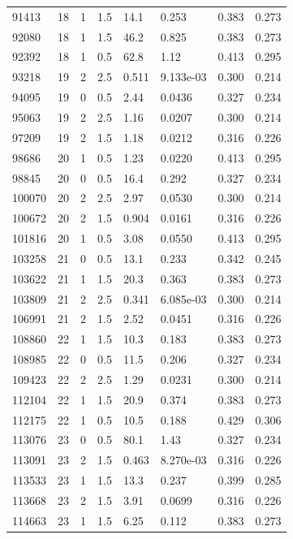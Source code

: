 \documentclass[preview]{standalone}
\begin{document}
{{{\begin{tabular}{L{1.2cm}C{1.2cm} C{0.3cm}C{0.5cm} C{1.4cm}C{1.4cm} C{1.4cm}C{1.4cm}}
  91413  &    18  & 1     & 1.5 &  14.1  & 0.253  & 0.383 &  0.273   \\ 
  92080  &    18  & 1     & 1.5 &  46.2  & 0.825  & 0.383 &  0.273   \\ 
  92392  &    18  & 1     & 0.5 &  62.8  & 1.12  & 0.413 &  0.295   \\ 
  93218  &    19  & 2     & 2.5 &  0.511  & 9.133e-03  & 0.300 &  0.214   \\ 
  94095  &    19  & 0     & 0.5 &  2.44  & 0.0436  & 0.327 &  0.234   \\ 
  95063  &    19  & 2     & 2.5 &  1.16  & 0.0207  & 0.300 &  0.214   \\ 
  97209  &    19  & 2     & 1.5 &  1.18  & 0.0212  & 0.316 &  0.226   \\ 
  98686  &    20  & 1     & 0.5 &  1.23  & 0.0220  & 0.413 &  0.295   \\ 
  98845  &    20  & 0     & 0.5 &  16.4  & 0.292  & 0.327 &  0.234   \\ 
  100070  &    20  & 2     & 2.5 &  2.97  & 0.0530  & 0.300 &  0.214   \\ 
  100672  &    20  & 2     & 1.5 &  0.904  & 0.0161  & 0.316 &  0.226   \\ 
  101816  &    20  & 1     & 0.5 &  3.08  & 0.0550  & 0.413 &  0.295   \\ 
  103258  &    21  & 0     & 0.5 &  13.1  & 0.233  & 0.342 &  0.245   \\ 
  103622  &    21  & 1     & 1.5 &  20.3  & 0.363  & 0.383 &  0.273   \\ 
  103809  &    21  & 2     & 2.5 &  0.341  & 6.085e-03  & 0.300 &  0.214   \\ 
  106991  &    21  & 2     & 1.5 &  2.52  & 0.0451  & 0.316 &  0.226   \\ 
  108860  &    22  & 1     & 1.5 &  10.3  & 0.183  & 0.383 &  0.273   \\ 
  108985  &    22  & 0     & 0.5 &  11.5  & 0.206  & 0.327 &  0.234   \\ 
  109423  &    22  & 2     & 2.5 &  1.29  & 0.0231  & 0.300 &  0.214   \\ 
  112104  &    22  & 1     & 1.5 &  20.9  & 0.374  & 0.383 &  0.273   \\ 
  112175  &    22  & 1     & 0.5 &  10.5  & 0.188  & 0.429 &  0.306   \\ 
  113076  &    23  & 0     & 0.5 &  80.1  & 1.43  & 0.327 &  0.234   \\ 
  113091  &    23  & 2     & 1.5 &  0.463  & 8.270e-03  & 0.316 &  0.226   \\ 
  113533  &    23  & 1     & 1.5 &  13.3  & 0.237  & 0.399 &  0.285   \\ 
  113668  &    23  & 2     & 1.5 &  3.91  & 0.0699  & 0.316 &  0.226   \\ 
  114663  &    23  & 1     & 1.5 &  6.25  & 0.112  & 0.383 &  0.273   \\ 
\hline 
\end{tabular} 

}}}
\end{document}
